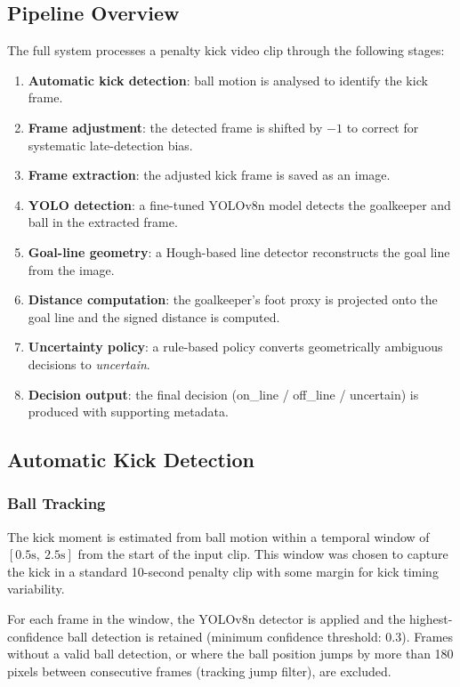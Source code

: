 \documentclass[12pt,a4paper,twoside]{article}
\begin{document}
\subsection{Pipeline Overview}

The full system processes a penalty kick video clip through the following stages:

\begin{enumerate}
  \item \textbf{Automatic kick detection}: ball motion is analysed to identify
        the kick frame.
  \item \textbf{Frame adjustment}: the detected frame is shifted by $-1$ to
        correct for systematic late-detection bias.
  \item \textbf{Frame extraction}: the adjusted kick frame is saved as an image.
  \item \textbf{YOLO detection}: a fine-tuned YOLOv8n model detects the
        goalkeeper and ball in the extracted frame.
  \item \textbf{Goal-line geometry}: a Hough-based line detector reconstructs
        the goal line from the image.
  \item \textbf{Distance computation}: the goalkeeper's foot proxy is projected
        onto the goal line and the signed distance is computed.
  \item \textbf{Uncertainty policy}: a rule-based policy converts geometrically
        ambiguous decisions to \textit{uncertain}.
  \item \textbf{Decision output}: the final decision (on\_line / off\_line /
        uncertain) is produced with supporting metadata.
\end{enumerate}

\subsection{Automatic Kick Detection}

\subsubsection{Ball Tracking}

The kick moment is estimated from ball motion within a temporal window of
$[0.5\text{s},\ 2.5\text{s}]$ from the start of the input clip. This window
was chosen to capture the kick in a standard 10-second penalty clip with some
margin for kick timing variability.

For each frame in the window, the YOLOv8n detector is applied and the highest-
confidence ball detection is retained (minimum confidence threshold: 0.3).
Frames without a valid ball detection, or where the ball position jumps by more
than 180 pixels between consecutive frames (tracking jump filter), are excluded.
\end{document}

